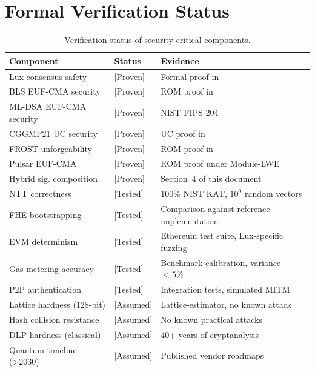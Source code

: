 \section{Formal Verification Status}

\label{sec:verification}

\begin{table}[ht]
\centering
\caption{Verification status of security-critical components.}
\label{tab:verification}
\begin{tabular}{p{3.5cm}lp{4cm}}
\toprule
\textbf{Component} & \textbf{Status} & \textbf{Evidence} \\
\midrule
Lux consensus safety & [Proven] & Formal proof in~\cite{rocket2020scalable} \\
BLS EUF-CMA security & [Proven] & ROM proof in~\cite{boneh2001bls} \\
ML-DSA EUF-CMA security & [Proven] & NIST FIPS 204~\cite{fips204} \\
CGGMP21 UC security & [Proven] & UC proof in~\cite{canetti2021uc} \\
FROST unforgeability & [Proven] & ROM proof in~\cite{komlo2020frost} \\
Pulsar EUF-CMA & [Proven] & ROM proof under Module-LWE \\
Hybrid sig. composition & [Proven] & Section~4 of this document \\
NTT correctness & [Tested] & 100\% NIST KAT, $10^9$ random vectors \\
FHE bootstrapping & [Tested] & Comparison against reference implementation \\
EVM determinism & [Tested] & Ethereum test suite, Lux-specific fuzzing \\
Gas metering accuracy & [Tested] & Benchmark calibration, variance $< 5\%$ \\
P2P authentication & [Tested] & Integration tests, simulated MITM \\
Lattice hardness (128-bit) & [Assumed] & Lattice-estimator, no known attack \\
Hash collision resistance & [Assumed] & No known practical attacks \\
DLP hardness (classical) & [Assumed] & 40+ years of cryptanalysis \\
Quantum timeline (>2030) & [Assumed] & Published vendor roadmaps \\
\bottomrule
\end{tabular}
\end{table}

